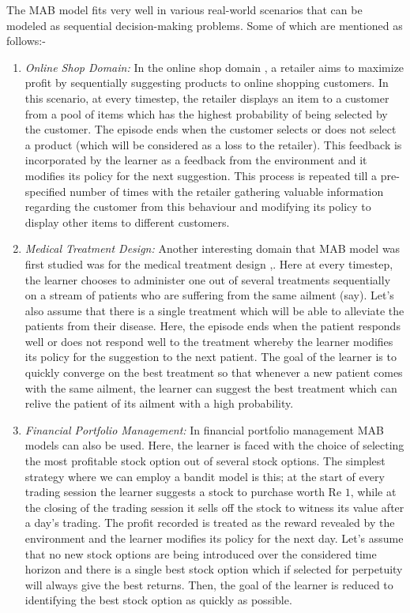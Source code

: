 
The MAB model fits very well in various real-world scenarios that can be modeled as sequential decision-making problems. Some of which are mentioned as follows:-
\begin{enumerate}
\item \emph{Online Shop Domain:} In the online shop domain \citep{ghavamzadeh2015bayesian}, a retailer aims to maximize profit by sequentially suggesting products to online shopping customers. In this scenario, at every timestep, the retailer displays an item to a customer from a pool of items which has the highest probability of being selected by the customer. The episode ends when the customer selects or does not select a product (which will be considered as a loss to the retailer). This feedback is incorporated by the learner as a feedback from the environment and it modifies its policy for the next suggestion. This process is repeated till a pre-specified number of times with the retailer gathering valuable information regarding the customer from this behaviour and modifying its policy to display other items to different customers.
\item \emph{Medical Treatment Design:} Another interesting domain that MAB model was first studied was for the medical treatment design \citep{thompson1933likelihood},\citep{thompson1935theory}. Here at every timestep, the learner chooses to administer one out of several treatments sequentially on a stream of patients who are suffering from the same ailment (say). Let's also assume that there is a single treatment which will be able to alleviate the patients from their disease. Here, the episode ends when the patient responds well or does not respond well to the treatment whereby the learner modifies its policy for the suggestion to the next patient. The goal of the learner is to quickly converge on the best treatment so that whenever a new patient comes with the same ailment, the learner can suggest the best treatment which can relive the patient of its ailment with a high probability.
\item \emph{Financial Portfolio Management:} In financial portfolio management MAB models can also be used. Here, the learner is faced with the choice of selecting the most profitable stock option out of several stock options. The simplest strategy where we can employ a bandit model is this; at the start of every trading session the learner suggests a stock to purchase worth Re $1$, while at the closing of the trading session it sells off the stock to witness its value after a day's trading. The  profit recorded is treated as the reward revealed by the environment and the learner modifies its policy for the next day. Let's assume that no new stock options are being introduced over the considered time horizon and there is a single best stock option which if selected for perpetuity will always give the best returns. Then, the goal of the learner is reduced to identifying the best stock option as quickly as possible. 

\end{enumerate}
